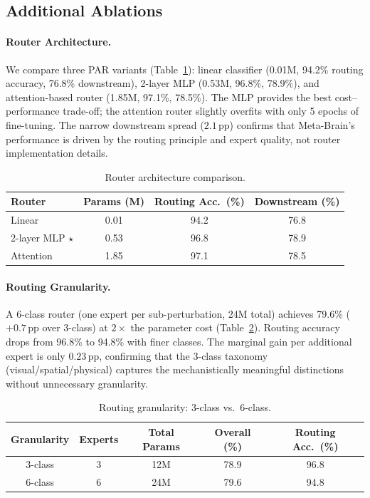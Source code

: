 \documentclass[10pt,twocolumn]{article}
\newcommand{\ours}{Meta-Brain}
\newcommand{\pp}{\,\text{pp}}
\begin{document}
\subsection{Additional Ablations}
\label{sec:additional_ablations}

\paragraph{Router Architecture.}
We compare three PAR variants (Table~\ref{tab:router_arch}): linear classifier (0.01M, 94.2\% routing accuracy, 76.8\% downstream), 2-layer MLP (0.53M, 96.8\%, 78.9\%), and attention-based router (1.85M, 97.1\%, 78.5\%).
The MLP provides the best cost--performance trade-off; the attention router slightly overfits with only 5 epochs of fine-tuning.
The narrow downstream spread ($2.1\pp$) confirms that \ours{}'s performance is driven by the routing principle and expert quality, not router implementation details.

\begin{table}[t]
\centering
\caption{Router architecture comparison.}
\label{tab:router_arch}
\small
\begin{tabular}{@{}lccc@{}}
\toprule
Router & Params (M) & Routing Acc.\ (\%) & Downstream (\%) \\
\midrule
Linear & 0.01 & 94.2 & 76.8 \\
2-layer MLP $\star$ & 0.53 & 96.8 & 78.9 \\
Attention & 1.85 & 97.1 & 78.5 \\
\bottomrule
\end{tabular}
\end{table}

\paragraph{Routing Granularity.}
A 6-class router (one expert per sub-perturbation, 24M total) achieves 79.6\% ($+0.7\pp$ over 3-class) at $2\times$ the parameter cost (Table~\ref{tab:granularity}).
Routing accuracy drops from 96.8\% to 94.8\% with finer classes.
The marginal gain per additional expert is only $0.23\pp$, confirming that the 3-class taxonomy (visual/spatial/physical) captures the mechanistically meaningful distinctions without unnecessary granularity.

\begin{table}[t]
\centering
\caption{Routing granularity: 3-class vs.\ 6-class.}
\label{tab:granularity}
\small
\begin{tabular}{@{}ccccc@{}}
\toprule
Granularity & Experts & Total Params & Overall (\%) & Routing Acc.\ (\%) \\
\midrule
3-class & 3 & 12M & 78.9 & 96.8 \\
6-class & 6 & 24M & 79.6 & 94.8 \\
\bottomrule
\end{tabular}
\end{table}
\end{document}
